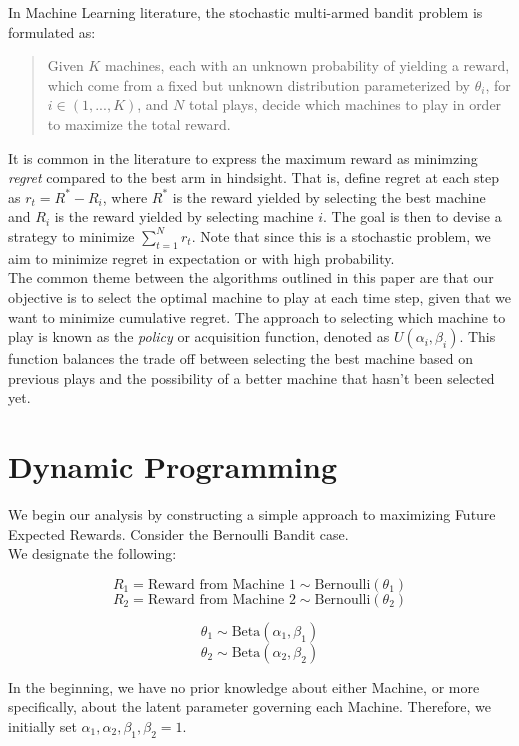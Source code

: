 \documentclass{article}
\begin{document}
In Machine Learning literature, the stochastic multi-armed bandit problem is formulated as:

\begin{quote}
Given $K$ machines, each with an unknown probability of yielding a reward, which come from a fixed but unknown distribution parameterized by $\theta_i$, for $i \in (1, ..., K)$, and $N$ total plays, decide which machines to play in order to maximize the total reward.
\end{quote}

It is common in the literature to express the maximum reward as minimzing \textit{regret} compared to the best arm in hindsight. That is, define regret at each step as $r_{t} = R^* - R_{i}$, where $R^*$ is the reward yielded by selecting the best machine and $R_{i}$ is the reward yielded by selecting machine $i$. The goal is then to devise a strategy to minimize $\sum_{t=1}^N r_{t}$. Note that since this is a stochastic problem, we aim to minimize regret in expectation or with high probability.\\

The common theme between the algorithms outlined in this paper are that our objective is to select the optimal machine to play at each time step, given that we want to minimize cumulative regret. The approach to selecting which machine to play is known as the \textit{policy} or acquisition function, denoted as $U(\alpha_i, \beta_i)$. This function balances the trade off between selecting the best machine based on previous plays and the possibility of a better machine that hasn't been selected yet.

\section{Dynamic Programming}


We begin our analysis by constructing a simple approach to maximizing Future Expected Rewards. Consider the Bernoulli Bandit case.\\

We designate the following:

$$R_1 = \text{Reward from Machine 1} \sim \text{Bernoulli}(\theta_1)$$
$$R_2 = \text{Reward from Machine 2} \sim \text{Bernoulli}(\theta_2)$$

$$\theta_1 \sim \text{Beta}(\alpha_1, \beta_1)$$
$$\theta_2 \sim \text{Beta}(\alpha_2, \beta_2)$$

In the beginning, we have no prior knowledge about either Machine, or more specifically, about the latent parameter governing each Machine. Therefore, we initially set $\alpha_1, \alpha_2, \beta_1, \beta_2 = 1$. \\
\end{document}
